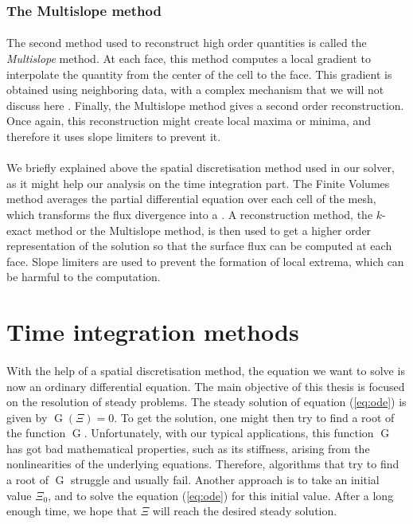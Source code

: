       \subsubsection{The Multislope method}

        \paragraph{}
        The second method used to reconstruct high order quantities is called the \emph{Multislope} method.
        At each face, this method computes a local gradient to interpolate the quantity from the center of the cell to the face.
        This gradient is obtained using neighboring data, with a complex mechanism that we will not discuss here \cite{LeTouzeMurroneGuillard2015}.
        Finally, the Multislope method gives a second order reconstruction.
        Once again, this reconstruction might create local maxima or minima, and therefore it uses slope limiters \cite{Venkatakrishnan1993, BergerAftosmis2005} to prevent it.


      \paragraph{}
      We briefly explained above the spatial discretisation method used in our solver, as it might help our analysis on the time integration part.
      The Finite Volumes method averages the partial differential equation over each cell of the mesh, which transforms the flux divergence into a .
      A reconstruction method, the $k$-exact method or the Multislope method, is then used to get a higher order representation of the solution so that the surface flux can be computed at each face.
      Slope limiters are used to prevent the formation of local extrema, which can be harmful to the computation.


  \section{Time integration methods}

    \paragraph{}
    With the help of a spatial discretisation method, the equation we want to solve is now an ordinary differential equation.
    The main objective of this thesis is focused on the resolution of steady problems.
    The steady solution of equation (\ref{eq:ode}) is given by $\operatorname{G}\left(\Xi\right) = 0$.
    To get the solution, one might then try to find a root of the function $\operatorname{G}$.
    Unfortunately, with our typical applications, this function $\operatorname{G}$ has got bad mathematical properties, such as its stiffness, arising from the nonlinearities of the underlying equations.
    Therefore, algorithms that try to find a root of $\operatorname{G}$ struggle and usually fail.
    Another approach is to take an initial value $\Xi_0$, and to solve the equation (\ref{eq:ode}) for this initial value.
    After a long enough time, we hope that $\Xi$ will reach the desired steady solution.


